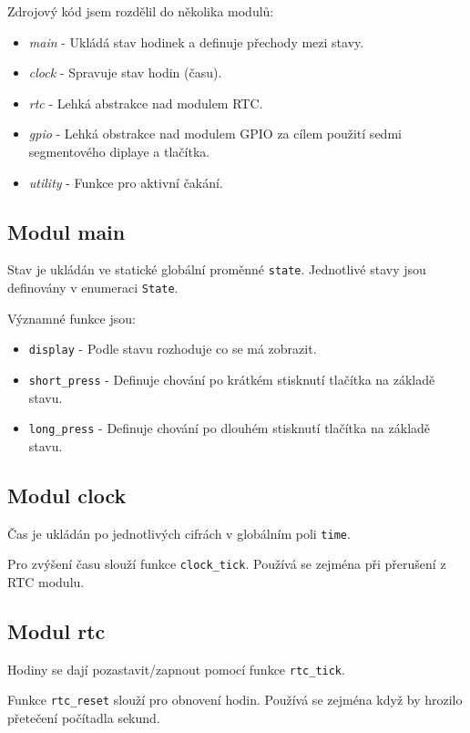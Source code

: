 \documentclass{article}
\begin{document}
Zdrojový kód jsem rozdělil do několika modulů:
\begin{itemize}
    \item \textit{main} - Ukládá stav hodinek a definuje přechody mezi stavy.
    \item \textit{clock} - Spravuje stav hodin (času).
    \item \textit{rtc} - Lehká abstrakce nad modulem RTC.
    \item \textit{gpio} - Lehká obstrakce nad modulem GPIO za cílem použití
          sedmi segmentového diplaye a tlačítka.
    \item \textit{utility} - Funkce pro aktivní čakání.
\end{itemize}

\subsection{Modul main}

Stav je ukládán ve statické globální proměnné \verb|state|. Jednotlivé stavy
jsou definovány v enumeraci \verb|State|.

Významné funkce jsou:
\begin{itemize}
    \item \verb|display| - Podle stavu rozhoduje co se má zobrazit.
    \item \verb|short_press| - Definuje chování po krátkém stisknutí tlačítka
          na základě stavu.
    \item \verb|long_press| - Definuje chování po dlouhém stisknutí tlačítka
          na základě stavu.
\end{itemize}

\subsection{Modul clock}

Čas je ukládán po jednotlivých cifrách v globálním poli \verb|time|.

Pro zvýšení času slouží funkce \verb|clock_tick|. Používá se zejména při
přerušení z RTC modulu.

\subsection{Modul rtc}

Hodiny se dají pozastavit/zapnout pomocí funkce \verb|rtc_tick|.

Funkce \verb|rtc_reset| slouží pro obnovení hodin. Používá se zejména když by
hrozilo přetečení počítadla sekund.
\end{document}

